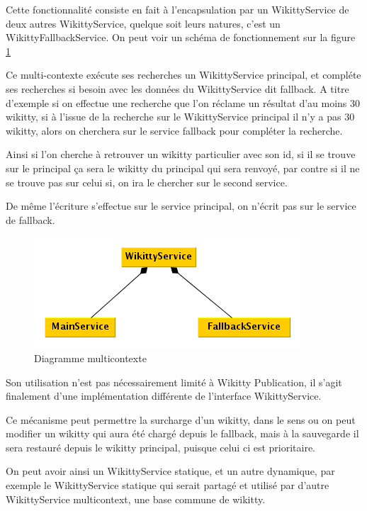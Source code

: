 Cette fonctionnalité consiste en fait à l'encapsulation par un WikittyService
de deux autres WikittyService, quelque soit leurs natures, c'est un 
WikittyFallbackService. On peut voir un schéma de fonctionnement sur la figure
\ref{diagmulticontext}

Ce multi-contexte exécute ses recherches un WikittyService principal, et
compléte ses recherches si besoin avec les données du WikittyService dit
fallback. A titre d'exemple si on effectue une recherche que l'on réclame un
résultat d'au moins 30 wikitty, si à l'issue de la recherche sur le WikittyService 
principal il n'y a pas 30 wikitty, alors on cherchera sur le service
fallback pour compléter la recherche. 

Ainsi si l'on cherche à retrouver un wikitty particulier avec son id, si il
se trouve sur le principal ça sera le wikitty du principal qui sera renvoyé, 
par contre si il ne se trouve pas sur celui si, on ira le chercher sur le second
service.

De même l'écriture s'effectue sur le service principal, on n'écrit pas sur le
service de fallback.

\begin{figure}[!ht]
\centering
\includegraphics{image/multicontext.png}
  		\caption{Diagramme multicontexte}
  		\label{diagmulticontext}
\end{figure}


Son utilisation n'est pas nécessairement limité à Wikitty Publication, il s'agit
finalement d'une implémentation différente de l'interface WikittyService. 

Ce mécanisme peut permettre la surcharge d'un wikitty, dans le sens ou on peut
modifier un wikitty qui aura été chargé depuis le fallback, mais à la sauvegarde
il sera restauré depuis le wikitty principal, puisque celui ci est prioritaire.

On peut avoir ainsi un WikittyService statique, et un autre dynamique, par
exemple le WikittyService statique qui serait partagé et utilisé par d'autre
WikittyService multicontext, une base commune de wikitty. 

